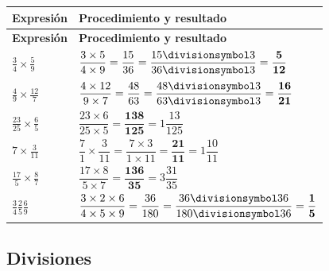 \documentclass[spanish,letterpaper,oneside]{article}
\let\div\divisionsymbol
\begin{document}
{\small{}\renewcommand{\arraystretch}{1.35}
\begin{longtable}{|>{\raggedright\arraybackslash}p{}|>{\raggedright\arraybackslash}p{}|}\hline
\rowcolor{iiiepePale} \textbf{Expresión} & \textbf{Procedimiento y resultado} \\\hline
\endfirsthead
\hline
\rowcolor{iiiepePale} \textbf{Expresión} & \textbf{Procedimiento y resultado} \\\hline
\endhead
$\frac{3}{4}\times \frac{5}{9}$ & $\dfrac{3\times 5}{4\times 9}=\dfrac{15}{36}=\dfrac{15\div 3}{36\div 3}=\mathbf{\dfrac{5}{12}}$ \\\hline
$\frac{4}{9}\times \frac{12}{7}$ & $\dfrac{4\times 12}{9\times 7}=\dfrac{48}{63}=\dfrac{48\div 3}{63\div 3}=\mathbf{\dfrac{16}{21}}$ \\\hline
$\frac{23}{25}\times \frac{6}{5}$ & $\dfrac{23\times 6}{25\times 5}=\mathbf{\dfrac{138}{125}}=1\dfrac{13}{125}$ \\\hline
$7\times \frac{3}{11}$ & $\dfrac{7}{1}\times\dfrac{3}{11}=\dfrac{7\times 3}{1\times 11}=\mathbf{\dfrac{21}{11}}=1\dfrac{10}{11}$ \\\hline
$\frac{17}{5}\times \frac{8}{7}$ & $\dfrac{17\times 8}{5\times 7}=\mathbf{\dfrac{136}{35}}=3\dfrac{31}{35}$ \\\hline
$\frac34\frac25\frac69$ & $\dfrac{3\times 2\times 6}{4\times 5\times 9}=\dfrac{36}{180}=\dfrac{36\div 36}{180\div 36}=\mathbf{\dfrac{1}{5}}$ \\\hline
\end{longtable}}

\subsection*{Divisiones}
\end{document}

